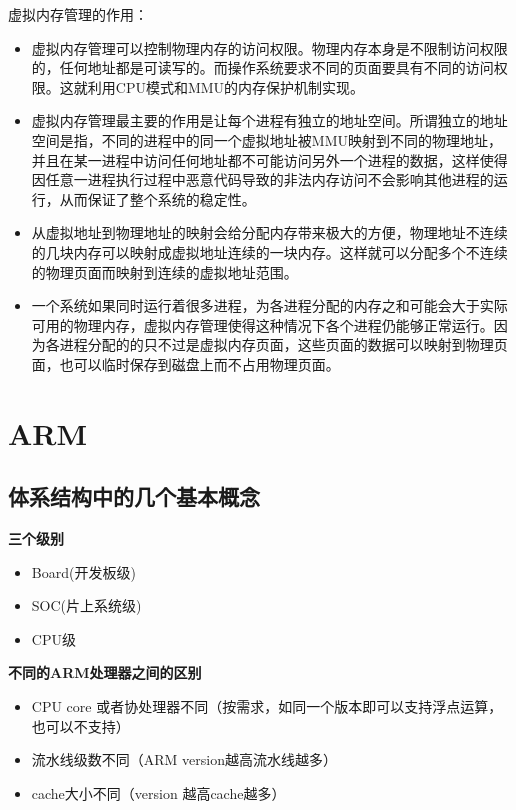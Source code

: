 虚拟内存管理的作用：
\begin{itemize}
	\item  虚拟内存管理可以控制物理内存的访问权限。物理内存本身是不限制访问权限的，任何地址都是可读写的。而操作系统要求不同的页面要具有不同的访问权限。这就利用CPU模式和MMU的内存保护机制实现。
	\item  虚拟内存管理最主要的作用是让每个进程有独立的地址空间。所谓独立的地址空间是指，不同的进程中的同一个虚拟地址被MMU映射到不同的物理地址，并且在某一进程中访问任何地址都不可能访问另外一个进程的数据，这样使得因任意一进程执行过程中恶意代码导致的非法内存访问不会影响其他进程的运行，从而保证了整个系统的稳定性。
	\item  从虚拟地址到物理地址的映射会给分配内存带来极大的方便，物理地址不连续的几块内存可以映射成虚拟地址连续的一块内存。这样就可以分配多个不连续的物理页面而映射到连续的虚拟地址范围。
	\item  一个系统如果同时运行着很多进程，为各进程分配的内存之和可能会大于实际可用的物理内存，虚拟内存管理使得这种情况下各个进程仍能够正常运行。因为各进程分配的的只不过是虚拟内存页面，这些页面的数据可以映射到物理页面，也可以临时保存到磁盘上而不占用物理页面。
\begin{code}
系统可分配的内存总量 = 物理内存大小 + 交换设备大小(swap)}
\end{code}
\end{itemize}

\section{ARM}
\subsection{体系结构中的几个基本概念}
\textbf{三个级别}
\begin{itemize}
	\item Board(开发板级)
	\item SOC(片上系统级)
	\item CPU级
\end{itemize}

\textbf{不同的ARM处理器之间的区别}
\begin{itemize}
	\item CPU core 或者协处理器不同（按需求，如同一个版本即可以支持浮点运算，也可以不支持）
	\item 流水线级数不同（ARM version越高流水线越多）
	\item cache大小不同（version 越高cache越多）
\end{itemize}

